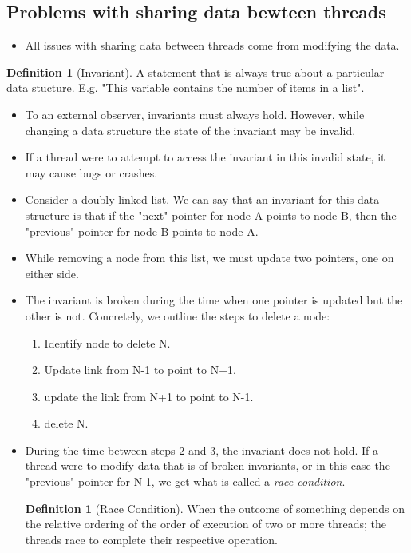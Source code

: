 \documentclass[11pt, a4paper]{article}
\theoremstyle{definition}
\newtheorem{definition}[theorem]{Definition}
\theoremstyle{remark}
\begin{document}
\subsection{Problems with sharing data bewteen threads}
\begin{itemize}
    \item All issues with sharing data between threads come from modifying the data.
\end{itemize}
    \begin{definition}[Invariant]
        A statement that is always true about a particular data stucture. E.g. "This variable contains the number of items in a list".
    \end{definition}
\begin{itemize}
    \item To an external observer, invariants must always hold. However, while changing a data structure the state of the invariant may be invalid. 
    \item If a thread were to attempt to access the invariant in this invalid state, it may cause bugs or crashes.
    \item Consider a doubly linked list. We can say that an invariant for this data structure is that if the "next" pointer for node A points to node B, then the "previous" pointer for node B points to node A. 
    \item While removing a node from this list, we must update two pointers, one on either side.
    \item The invariant is broken during the time when one pointer is updated but the other is not. Concretely, we outline the steps to delete a node:
    \begin{enumerate}
        \item Identify node to delete N.
        \item Update link from N-1 to point to N+1.
        \item update the link from N+1 to point to N-1.
        \item delete N.
    \end{enumerate}
    \item During the time between steps 2 and 3, the invariant does not hold. If a thread were to modify data that is of broken invariants, or in this case the "previous" pointer for N-1, we get what is called a \textit{race condition}.
    \begin{definition}[Race Condition]
        When the outcome of something depends on the relative ordering of the order of execution of two or more threads; the threads race to complete their respective operation.

\end{definition}
\end{itemize}
\end{document}
